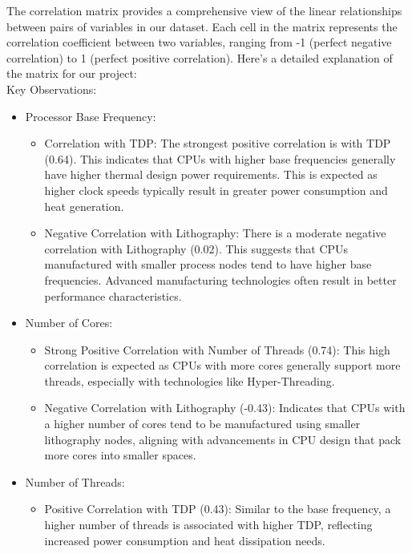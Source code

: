 The correlation matrix provides a comprehensive view of the linear relationships between pairs of variables in our dataset. Each cell in the matrix represents the correlation coefficient between two variables, ranging from -1 (perfect negative correlation) to 1 (perfect positive correlation). Here's a detailed explanation of the matrix for our project:\\[6pt]
Key Observations:
\begin{itemize}
    \item Processor Base Frequency:
    \begin{itemize}
        \item Correlation with TDP: The strongest positive correlation is with TDP (0.64). This indicates that CPUs with higher base frequencies generally have higher thermal design power requirements. This is expected as higher clock speeds typically result in greater power consumption and heat generation.
        \item Negative Correlation with Lithography: There is a moderate negative correlation with Lithography (0.02). This suggests that CPUs manufactured with smaller process nodes tend to have higher base frequencies. Advanced manufacturing technologies often result in better performance characteristics.
    \end{itemize}
    
    \item Number of Cores:
    \begin{itemize}
        \item Strong Positive Correlation with Number of Threads (0.74): This high correlation is expected as CPUs with more cores generally support more threads, especially with technologies like Hyper-Threading.
        \item Negative Correlation with Lithography (-0.43): Indicates that CPUs with a higher number of cores tend to be manufactured using smaller lithography nodes, aligning with advancements in CPU design that pack more cores into smaller spaces.
    \end{itemize}
    
    \item Number of Threads:
    \begin{itemize}
        \item Positive Correlation with TDP (0.43): Similar to the base frequency, a higher number of threads is associated with higher TDP, reflecting increased power consumption and heat dissipation needs.
    \end{itemize}
    

\end{itemize}
